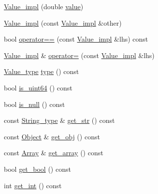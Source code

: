 \begin{DoxyCompactItemize}
\item 
\hyperlink{classjson__spirit_1_1_value__impl_aea4b49daa48cf31553c14c722cef1bd9}{Value\+\_\+impl} (double \hyperlink{cache_8cc_a0f61d63b009d0880a89c843bd50d8d76}{value})
\item 
\hyperlink{classjson__spirit_1_1_value__impl_ababc13bca769d6d48fa5d74fb59cb6cb}{Value\+\_\+impl} (const \hyperlink{classjson__spirit_1_1_value__impl}{Value\+\_\+impl} \&other)
\item 
bool \hyperlink{classjson__spirit_1_1_value__impl_ad75e43b8abc744e82e06d11da8917c79}{operator==} (const \hyperlink{classjson__spirit_1_1_value__impl}{Value\+\_\+impl} \&lhs) const 
\item 
\hyperlink{classjson__spirit_1_1_value__impl}{Value\+\_\+impl} \& \hyperlink{classjson__spirit_1_1_value__impl_a2d0698ca9e9a935d1d370e4aefeb9ae7}{operator=} (const \hyperlink{classjson__spirit_1_1_value__impl}{Value\+\_\+impl} \&lhs)
\item 
\hyperlink{namespacejson__spirit_aeaad57c912e0370a76f60cd510ad3d74}{Value\+\_\+type} \hyperlink{classjson__spirit_1_1_value__impl_a1ba338778c3415bf0c740e965790d439}{type} () const 
\item 
bool \hyperlink{classjson__spirit_1_1_value__impl_a99f6c7b2fe9c897401a24b6606325117}{is\+\_\+uint64} () const 
\item 
bool \hyperlink{classjson__spirit_1_1_value__impl_a50bf037c8c8ad4fa6e7a6c72a43c6e91}{is\+\_\+null} () const 
\item 
const \hyperlink{classjson__spirit_1_1_value__impl_a7af638128a4e0dd86ab33c989c3e5ebf}{String\+\_\+type} \& \hyperlink{classjson__spirit_1_1_value__impl_a0e02b3a4e65ae45f069ee938fee40f80}{get\+\_\+str} () const 
\item 
const \hyperlink{classjson__spirit_1_1_value__impl_ac4467b91c71f897bab0c6d74864ae991}{Object} \& \hyperlink{classjson__spirit_1_1_value__impl_a85bcead33b915d62f83bb95ad824da4f}{get\+\_\+obj} () const 
\item 
const \hyperlink{classjson__spirit_1_1_value__impl_a8cbad4704c204a3421817f08a0b44dd6}{Array} \& \hyperlink{classjson__spirit_1_1_value__impl_a03541c56cdbab1f794982fb73a8e4361}{get\+\_\+array} () const 
\item 
bool \hyperlink{classjson__spirit_1_1_value__impl_a2c153630e79788e7983a9c490acde15d}{get\+\_\+bool} () const 
\item 
int \hyperlink{classjson__spirit_1_1_value__impl_ad437ac0c465adaeefda05eef57a99248}{get\+\_\+int} () const 
\item 

\end{DoxyCompactItemize}

